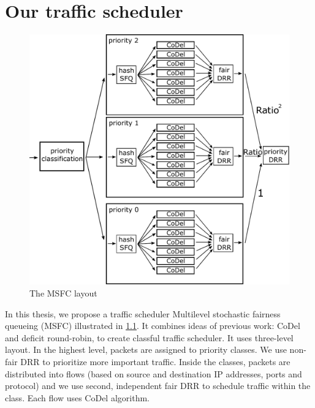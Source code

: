 \chapter{Our traffic scheduler}
\label{chap02}

\begin{figure}
	\centering
	\includegraphics[width=137mm]{drawings/msfc}
	\caption{The MSFC layout}
	\label{fig10:msfc}
\end{figure}

In this thesis, we propose a traffic scheduler Multilevel stochastic fairness queueing (MSFC) illustrated in \ref{fig10:msfc}. It combines ideas of previous work: CoDel and deficit round-robin, to create classful traffic scheduler. It uses three-level layout. In the highest level, packets are assigned to priority classes. We use non-fair DRR to prioritize more important traffic. Inside the classes, packets are distributed into flows (based on source and destination IP addresses, ports and protocol) and we use second, independent fair DRR to schedule traffic within the class. Each flow uses CoDel algorithm.

